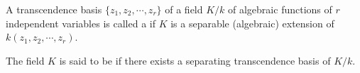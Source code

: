 A transcendence basis $\{z_1, z_2, \cdots, z_r\}$ of a field $K/k$ of algebraic functions of $r$ independent variables is called a  if $K$ is a separable (algebraic) extension of $k(z_1, z_2, \cdots, z_r)$.

The field $K$ is said to be  if there exists a separating transcendence basis of $K/k$.
